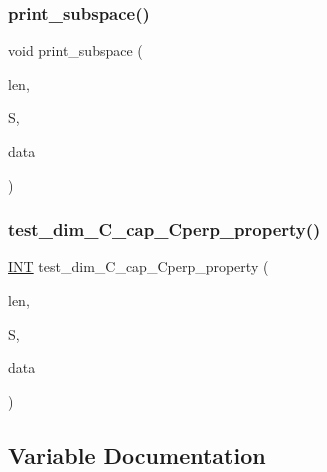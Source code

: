 \subsubsection{\texorpdfstring{print\+\_\+subspace()}{print\_subspace()}}
{\footnotesize\ttfamily void print\+\_\+subspace (\begin{DoxyParamCaption}\item[{\mbox{\hyperlink{galois_8h_a09fddde158a3a20bd2dcadb609de11dc}{I\+NT}}}]{len,  }\item[{\mbox{\hyperlink{galois_8h_a09fddde158a3a20bd2dcadb609de11dc}{I\+NT}} $\ast$}]{S,  }\item[{void $\ast$}]{data }\end{DoxyParamCaption})}

\mbox{\label{subspace__orbits__main_8_c_abc1f3820a6262d17d9a173dff4e9e761}} 
\subsubsection{\texorpdfstring{test\+\_\+dim\+\_\+\+C\+\_\+cap\+\_\+\+Cperp\+\_\+property()}{test\_dim\_C\_cap\_Cperp\_property()}}
{\footnotesize\ttfamily \mbox{\hyperlink{galois_8h_a09fddde158a3a20bd2dcadb609de11dc}{I\+NT}} test\+\_\+dim\+\_\+\+C\+\_\+cap\+\_\+\+Cperp\+\_\+property (\begin{DoxyParamCaption}\item[{\mbox{\hyperlink{galois_8h_a09fddde158a3a20bd2dcadb609de11dc}{I\+NT}}}]{len,  }\item[{\mbox{\hyperlink{galois_8h_a09fddde158a3a20bd2dcadb609de11dc}{I\+NT}} $\ast$}]{S,  }\item[{void $\ast$}]{data }\end{DoxyParamCaption})}



\subsection{Variable Documentation}
\mbox{\label{subspace__orbits__main_8_c_a05f384e95d541f5e5dc58d360739ba99}} 
